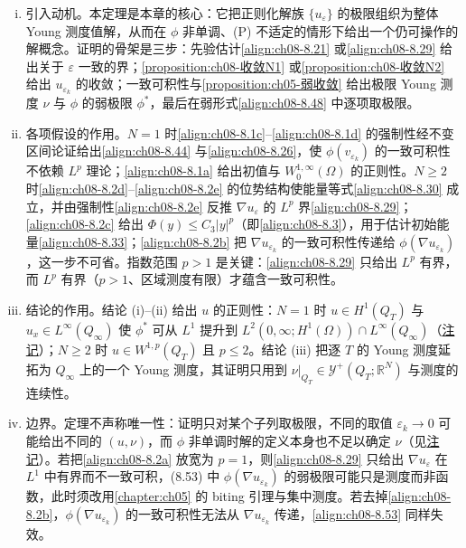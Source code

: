 \documentclass[../../main.tex]{subfiles}%
\begin{document}
\begin{remark}\label{remark:ch08-存在性}
\begin{enumerate}[(i)]
\item 引入动机。本定理是本章的核心：它把正则化解族 $\{u_\varepsilon\}$ 的极限组织为整体 Young 测度值解，从而在 $\phi$ 非单调、(P) 不适定的情形下给出一个仍可操作的解概念。证明的骨架是三步：先验估计\eqref{align:ch08-8.21} 或\eqref{align:ch08-8.29} 给出关于 $\varepsilon$ 一致的界；\cref{proposition:ch08-收敛N1} 或\cref{proposition:ch08-收敛N2} 给出 $u_{\varepsilon_k}$ 的收敛；一致可积性与\cref{proposition:ch05-弱收敛} 给出极限 Young 测度 $\nu$ 与 $\phi$ 的弱极限 $\phi^*$，最后在弱形式\eqref{align:ch08-8.48} 中逐项取极限。
\item 各项假设的作用。$N=1$ 时\eqref{align:ch08-8.1c}--\eqref{align:ch08-8.1d} 的强制性经不变区间论证给出\eqref{align:ch08-8.44} 与\eqref{align:ch08-8.26}，使 $\phi(v_{\varepsilon_k})$ 的一致可积性不依赖 $L^p$ 理论；\eqref{align:ch08-8.1a} 给出初值与 $W^{1,\infty}_0(\Omega)$ 的正则性。$N\geqslant2$ 时\eqref{align:ch08-8.2d}--\eqref{align:ch08-8.2e} 的位势结构使能量等式\eqref{align:ch08-8.30} 成立，并由强制性\eqref{align:ch08-8.2e} 反推 $\nabla u_\varepsilon$ 的 $L^p$ 界\eqref{align:ch08-8.29}；\eqref{align:ch08-8.2c} 给出 $\Phi(y)\leqslant C_3|y|^p$（即\eqref{align:ch08-8.3}），用于估计初始能量\eqref{align:ch08-8.33}；\eqref{align:ch08-8.2b} 把 $\nabla u_{\varepsilon_k}$ 的一致可积性传递给 $\phi(\nabla u_{\varepsilon_k})$，这一步不可省。指数范围 $p>1$ 是关键：\eqref{align:ch08-8.29} 只给出 $L^p$ 有界，而 $L^p$ 有界（$p>1$、区域测度有限）才蕴含一致可积性。
\item 结论的作用。结论 (i)--(ii) 给出 $u$ 的正则性：$N=1$ 时 $u\in H^1(Q_T)$ 与 $u_x\in L^\infty(Q_\infty)$ 使 $\phi^*$ 可从 $L^1$ 提升到 $L^2(0,\infty;H^1(\Omega))\cap L^\infty(Q_\infty)$（\hyperref[remark:ch08-w等于phi星]{注记}）；$N\geqslant2$ 时 $u\in W^{1,p}(Q_T)$ 且 $p\leqslant2$。结论 (iii) 把逐 $T$ 的 Young 测度延拓为 $Q_\infty$ 上的一个 Young 测度，其证明只用到 $\nu|_{Q_T}\in\mathcal{Y}^+(Q_T;\mathbb{R}^N)$ 与测度的连续性。
\item 边界。定理不声称唯一性：证明只对某个子列取极限，不同的取值 $\varepsilon_k\to0$ 可能给出不同的 $(u,\nu)$，而 $\phi$ 非单调时解的定义本身也不足以确定 $\nu$（见\hyperref[remark:ch08-Young测度值解]{注记}）。若把\eqref{align:ch08-8.2a} 放宽为 $p=1$，则\eqref{align:ch08-8.29} 只给出 $\nabla u_\varepsilon$ 在 $L^1$ 中有界而不一致可积，(8.53) 中 $\phi(\nabla u_{\varepsilon_k})$ 的弱极限可能只是测度而非函数，此时须改用\cref{chapter:ch05} 的 biting 引理与集中测度。若去掉\eqref{align:ch08-8.2b}，$\phi(\nabla u_{\varepsilon_k})$ 的一致可积性无法从 $\nabla u_{\varepsilon_k}$ 传递，\eqref{align:ch08-8.53} 同样失效。
\end{enumerate}
\end{remark}
\end{document}
